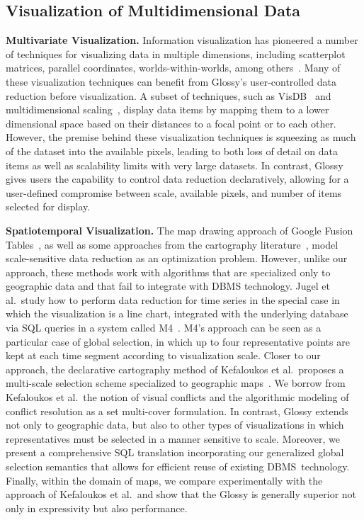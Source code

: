 \documentclass[11pt, oneside]{report}
\newcommand{\minisec}[1]{\noindent\textbf{#1.}}
\begin{document}
\subsection{Visualization of Multidimensional Data}
\label{sec:related:multidimensional}

\minisec{Multivariate Visualization}
Information visualization has pioneered a number of techniques for visualizing data in multiple dimensions, including scatterplot matrices, parallel coordinates, worlds-within-worlds, among others~\cite{CardMacS99:InfoVizBook,WongB94:InfoVizSurvey}. Many of these visualization techniques can benefit from Glossy's user-controlled data reduction before visualization. A subset of techniques, such as VisDB~\cite{KeimK95:VisDB} and multidimensional scaling~\cite{KruskalW78:MDS}, display data items by mapping them to a lower dimensional space based on their distances to a focal point or to each other. However, the premise behind these visualization techniques is squeezing as much of the dataset into the available pixels, leading to both loss of detail on data items as well as scalability limits with very large datasets. In contrast, Glossy gives users the capability to control data reduction declaratively, allowing for a user-defined compromise between scale, available pixels, and number of items selected for display.   

\minisec{Spatiotemporal Visualization}
The map drawing approach of Google Fusion Tables~\cite{DasSarmaLGMH12:FusionTables}, as well as some approaches from the cartography literature~\cite{NeunBW09:GeneralizationWeb,WareJT03:GeneralizationMeta}, model scale-sensitive data reduction as an optimization problem. However, unlike our approach, these methods work with algorithms that are specialized only to geographic data and that fail to integrate with DBMS technology. Jugel et al.~study how to perform data reduction for time series in the special case in which the visualization is a line chart, integrated with the underlying database via SQL queries in a system called M4~\cite{jugel:m4}. M4's approach can be seen as a particular case of global selection, in which up to four representative points are kept at each time segment according to visualization scale. Closer to our approach, the declarative cartography method of Kefaloukos et al.~proposes a multi-scale selection scheme specialized to geographic maps~\cite{KefaloukosSZ14:CVL}. We borrow from Kefaloukos et al.~the notion of visual conflicts and the algorithmic modeling of conflict resolution as a set multi-cover formulation. In contrast, Glossy extends not only to geographic data, but also to other types of visualizations in which representatives must be selected in a manner sensitive to scale. Moreover, we present a comprehensive SQL translation incorporating our generalized global selection semantics that allows for efficient reuse of existing DBMS~technology. Finally, within the domain of maps, we compare experimentally with the approach of Kefaloukos et al.~and show that the Glossy is generally superior not only in expressivity but also performance.    
\end{document}
